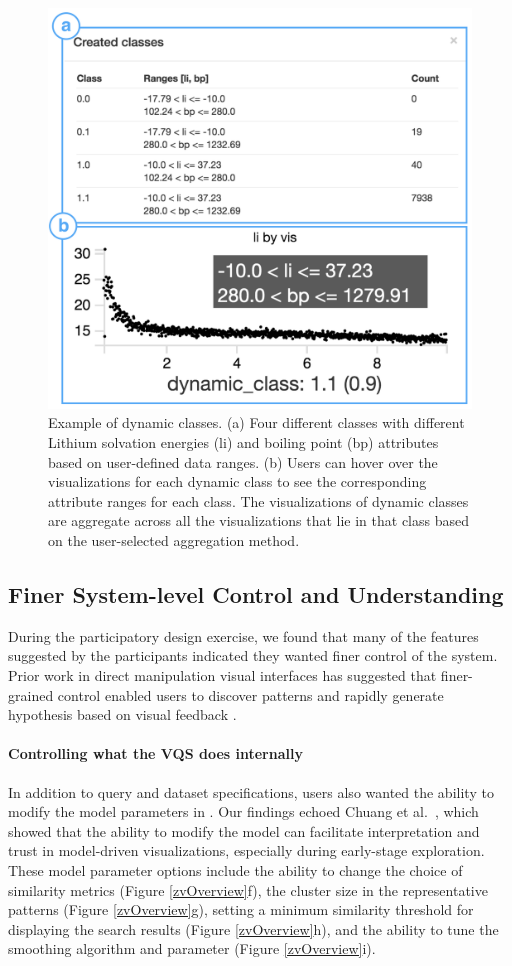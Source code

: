 \begin{figure}[ht!]
\centering
\includegraphics[width=0.7\linewidth]{figures/dcc_example.png}
\vspace{-6pt}
\caption{Example of dynamic classes. (a) Four different classes with different Lithium solvation energies (li) and boiling point (bp) attributes based on user-defined data ranges. (b) Users can hover over the visualizations for each dynamic class to see the corresponding attribute ranges for each class. The visualizations of dynamic classes are aggregate across all the visualizations that lie in that class based on the user-selected aggregation method.}
\label{dcc}
\end{figure}
\subsection{Finer System-level Control and  Understanding}
\par During the participatory design exercise, we found that many of the features suggested by the participants indicated they wanted finer control of the system. Prior work in direct manipulation visual interfaces has suggested that finer-grained control enabled users to discover patterns and rapidly generate hypothesis based on visual feedback \cite{Shneiderman1994,Shneiderman2007a}. 
\paragraph{Controlling what the VQS does internally}
In addition to query and dataset specifications, users also wanted the ability to modify the model parameters in \zv. Our findings echoed Chuang et al.~\cite{Chuang2012}, which showed that the ability to modify the model can facilitate interpretation and trust in model-driven visualizations, especially during early-stage exploration. These model parameter options include the ability to change the choice of similarity metrics (Figure \ref{zvOverview}f), the cluster size in the representative patterns (Figure \ref{zvOverview}g), setting a minimum similarity threshold for displaying the search results (Figure \ref{zvOverview}h), and the ability to tune the smoothing algorithm and parameter (Figure \ref{zvOverview}i).
